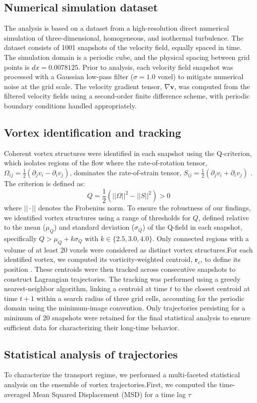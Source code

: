 \documentclass[]{article}
\begin{document}
\subsection{Numerical simulation dataset}The analysis is based on a dataset from a high-resolution direct numerical simulation of three-dimensional, homogeneous, and isothermal turbulence. The dataset consists of 1001 snapshots of the velocity field, equally spaced in time. The simulation domain is a periodic cube, and the physical spacing between grid points is $dx=0.0078125$. Prior to analysis, each velocity field snapshot was processed with a Gaussian low-pass filter ($\sigma=1.0$ voxel) to mitigate numerical noise at the grid scale. The velocity gradient tensor, $\nabla \mathbf{v}$, was computed from the filtered velocity fields using a second-order finite difference scheme, with periodic boundary conditions handled appropriately.\subsection{Vortex identification and tracking}Coherent vortex structures were identified in each snapshot using the Q-criterion, which isolates regions of the flow where the rate-of-rotation tensor, $\Omega_{ij} = \frac{1}{2}(\partial_j v_i - \partial_i v_j)$, dominates the rate-of-strain tensor, $S_{ij} = \frac{1}{2}(\partial_j v_i + \partial_i v_j)$  \citep{menon2021significancestraindominatedregionvortex}. The criterion is defined as:\begin{equation}Q = \frac{1}{2} \left( ||\Omega||^2 - ||S||^2 \right) > 0\end{equation}where $||\cdot||$ denotes the Frobenius norm. To ensure the robustness of our findings, we identified vortex structures using a range of thresholds for $Q$, defined relative to the mean ($\mu_Q$) and standard deviation ($\sigma_Q$) of the Q-field in each snapshot, specifically $Q > \mu_Q + k\sigma_Q$ with $k \in \{2.5, 3.0, 4.0\}$. Only connected regions with a volume of at least 20 voxels were considered as distinct vortex structures.For each identified vortex, we computed its vorticity-weighted centroid, $\mathbf{r}_c$, to define its position  \citep{kashyap2026emergencelocalorderinggiant}. These centroids were then tracked across consecutive snapshots to construct Lagrangian trajectories. The tracking was performed using a greedy nearest-neighbor algorithm, linking a centroid at time $t$ to the closest centroid at time $t+1$ within a search radius of three grid cells, accounting for the periodic domain using the minimum-image convention. Only trajectories persisting for a minimum of 20 snapshots were retained for the final statistical analysis to ensure sufficient data for characterizing their long-time behavior.\subsection{Statistical analysis of trajectories}To characterize the transport regime, we performed a multi-faceted statistical analysis on the ensemble of vortex trajectories.First, we computed the time-averaged Mean Squared Displacement (MSD) for a time lag $\tau$  
\end{document}
